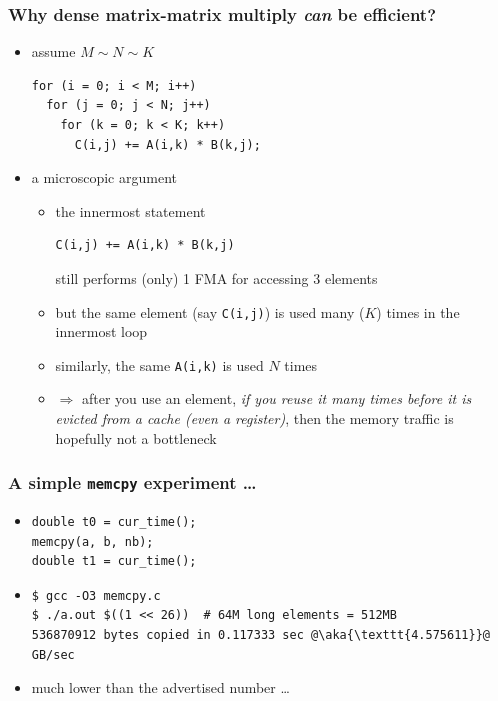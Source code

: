 \documentclass[12pt,dvipdfmx]{beamer}
\newcommand{\ao}[1]{{\color{blue}#1}}
\newcommand{\aka}[1]{{\color{red}#1}}
\begin{document}
\begin{frame}[fragile]
  \frametitle{Why dense matrix\ao{-matrix} multiply {\it can} be efficient?}
  \begin{itemize}
  \item assume $M \sim N \sim K$
\begin{lstlisting}
for (i = 0; i < M; i++)  
  for (j = 0; j < N; j++)  
    for (k = 0; k < K; k++)  
      C(i,j) += A(i,k) * B(k,j);
\end{lstlisting}


\item a microscopic argument
  \begin{itemize}
\item the innermost statement
\begin{lstlisting}
C(i,j) += A(i,k) * B(k,j)
\end{lstlisting}
still performs (only) \ao{1} FMA for accessing \ao{3} elements
\item but the same element (say {\tt C(i,j)}) is used many ($K$) times
  in the innermost loop
\item similarly, the same {\tt A(i,k)} is used $N$ times
\item $\Rightarrow$ after you use an element,
  \ao{\it if you reuse it many times before it is evicted from a cache
    (even a register)}, then the memory traffic is hopefully not a bottleneck
\end{itemize}
\end{itemize}

\end{frame}

\begin{frame}[fragile]
\frametitle{A simple \texttt{memcpy} experiment \ldots}
\begin{itemize}
\item<1-> []
\begin{lstlisting}
double t0 = cur_time();
memcpy(a, b, nb);
double t1 = cur_time();
\end{lstlisting}
\item<2-> []
\begin{lstlisting}
$ gcc -O3 memcpy.c
$ ./a.out $((1 << 26))  # 64M long elements = 512MB
536870912 bytes copied in 0.117333 sec @\aka{\texttt{4.575611}}@ GB/sec
\end{lstlisting} %
\item<3-> much lower than the advertised number \ldots
\end{itemize}
\end{frame}
\end{document}
